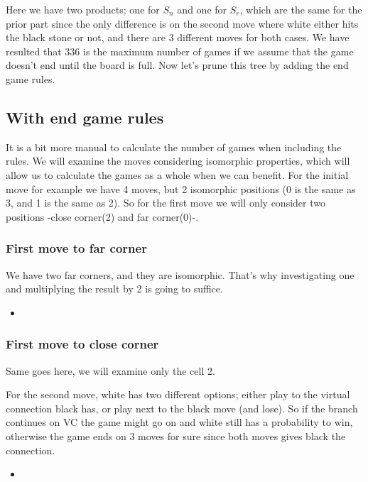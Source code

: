 Here we have two products; one for $S_n$ and one for $S_r$, which are the same for the prior part since the only difference is on the second move where white either hits the black stone or not, and there are 3 different moves for both cases. We have resulted that 336 is the maximum number of games if we assume that the game doesn't end until the board is full. Now let's prune this tree by adding the end game rules.

\subsection{With end game rules}

It is a bit more manual to calculate the number of games when including the rules. We will examine the moves considering isomorphic properties, which will allow us to calculate the games as a whole when we can benefit. For the initial move for example we have 4 moves, but 2 isomorphic positions (0 is the same as 3, and 1 is the same as 2). So for the first move we will only consider two positions -close corner(2) and far corner(0)-.

\subsubsection{First move to far corner}

We have two far corners, and they are isomorphic. That's why investigating one and multiplying the result by 2 is going to suffice.

\begin{itemize}
    \item 
\end{itemize}

\subsubsection{First move to close corner}

Same goes here, we will examine only the cell 2.

For the second move, white has two different options; either play to the virtual connection black has, or play next to the black move (and lose). So if the branch continues on VC the game might go on and white still has a probability to win, otherwise the game ends on 3 moves for sure since both moves gives black the connection.

\begin{itemize}
    \item 
\end{itemize}